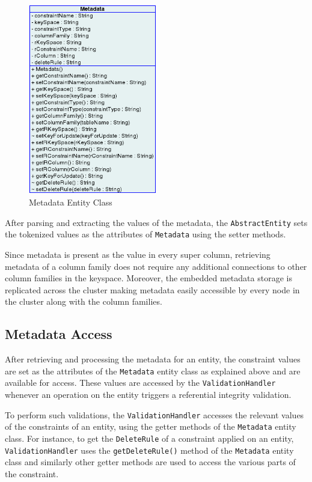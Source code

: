 	\begin{figure}[h] \centering
		\includegraphics[width=0.5\textwidth]{./figure/Solutions/MetadataEntityClassOnly.png}
		\caption{Metadata Entity Class}\label{fi:MetadataEntityClass}
	\end{figure}
	
After parsing and extracting the values of the metadata, the
\texttt{AbstractEntity} 
sets the tokenized values as the attributes of \texttt{Metadata} using the 
setter methods. 

Since  metadata is present as the value in every super column, retrieving
 metadata  of a column family  does not require any additional  
connections to other column families in the keyspace. Moreover, the embedded
metadata storage is replicated across the cluster making metadata easily
accessible by every node in the cluster along with the column families.	 
	 
	 
\subsection{Metadata Access} \label{ss:MD-Access-Sol1}

After retrieving and processing the metadata for an entity, the constraint
values are set as the attributes of the \texttt{Metadata} entity class as explained above and
are available for access.
These values are accessed by the \texttt{ValidationHandler} whenever an
operation on the entity triggers a referential integrity validation. 

To perform  such validations, the \texttt{ValidationHandler} accesses the
relevant values of the constraints of an entity, using the getter
methods of the \texttt{Metadata} entity class.
For instance, to get the \texttt{DeleteRule} of a constraint applied on an
entity, \texttt{ValidationHandler} uses the \texttt{getDeleteRule()} method of
the \texttt{Metadata} entity class and similarly other  getter methods
are used to access the various parts of the constraint.
	 
